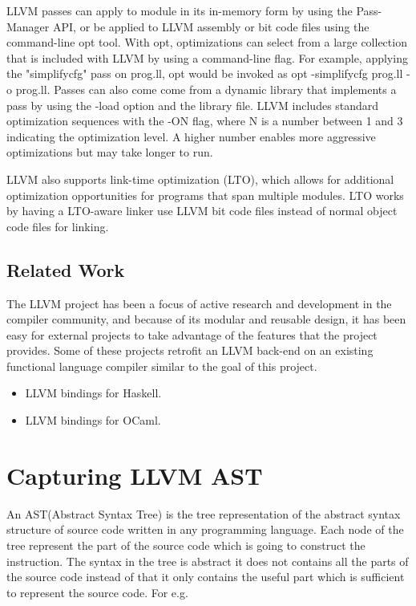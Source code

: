 \documentclass{book}
\begin{document}
	 LLVM passes can apply to module in its in-memory form by using the Pass-Manager API, or be applied to LLVM assembly or bit code files using the command-line opt tool. With opt, optimizations can select from a large collection that is included with LLVM by using a command-line flag.  For example, applying the "simplifycfg" pass on prog.ll, opt would be invoked as opt -simplifycfg prog.ll -o prog.ll. Passes can also come come from a dynamic library that implements a pass by using the -load option and the library file. LLVM includes standard optimization sequences with the -ON flag, where N is a number between 1 and 3 indicating the optimization level. A higher number enables more aggressive optimizations but may take longer to run.\newline \newline
	 
	 LLVM also supports link-time optimization (LTO),  which allows for additional optimization opportunities for programs that span multiple modules. LTO works by having a LTO-aware linker use LLVM bit code files instead of normal object code files for linking.
	 
	\section{Related Work}
	The LLVM project has been a focus of active research and development in the compiler	community, and because of its modular and reusable design, it has been easy for external
	projects to take advantage of the features that the project provides. Some of these projects retrofit an LLVM back-end on an existing functional language compiler similar to the goal
	of this project.
	
	\begin{itemize}
		\item LLVM bindings for Haskell.
		\item LLVM bindings for OCaml.
	\end{itemize}

\chapter{Capturing LLVM AST }
An AST(Abstract Syntax Tree) is the tree representation of the abstract syntax structure of source code written in any programming language. Each node of the tree represent the part of the source code which is going to construct the instruction. The syntax in the tree is abstract it does not contains all the parts of the source code instead of that it only contains the useful part which is sufficient to represent the source code. For e.g.\newline
\end{document}
